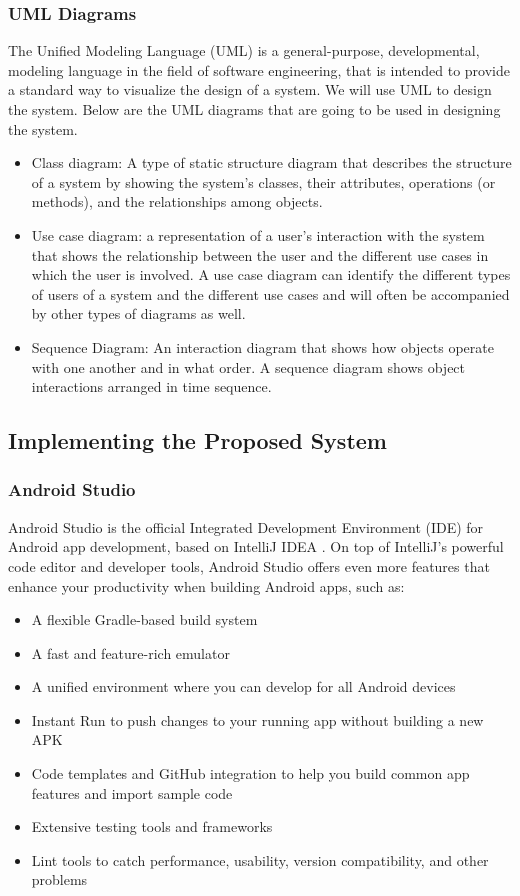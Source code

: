 \documentclass[12pt]{article}
\begin{document}
		\subsubsection{UML Diagrams}
		The Unified Modeling Language (UML) is a general-purpose, developmental, modeling language in the field of software engineering, that is intended to provide a standard way to visualize the design of a system. We will use UML to design the system. Below are the UML diagrams that are going to be used in designing the system.
			\begin{itemize}
				\item Class diagram: A type of static structure diagram that describes the structure of a system by showing the system's classes, their attributes, operations (or methods), and the relationships among objects.
				\item Use case diagram: a representation of a user's interaction with the system that shows the relationship between the user and the different use cases in which the user is involved. A use case diagram can identify the different types of users of a system and the different use cases and will often be accompanied by other types of diagrams as well.
				\item Sequence Diagram: An interaction diagram that shows how objects operate with one another and in what order. A sequence diagram shows object interactions arranged in time sequence.
			\end{itemize}
	
	
	\subsection{Implementing the Proposed System}
		\subsubsection{Android Studio}
		Android Studio is the official Integrated Development Environment (IDE) for Android app development, based on IntelliJ IDEA . On top of IntelliJ's powerful code editor and developer tools, Android Studio offers even more features that enhance your productivity when building Android apps, such as\cite{astudio}:
		\begin{itemize}
			\item A flexible Gradle-based build system
			\item A fast and feature-rich emulator
			\item A unified environment where you can develop for all Android devices
			\item Instant Run to push changes to your running app without building a new APK
			\item Code templates and GitHub integration to help you build common app features and import sample code
			\item Extensive testing tools and frameworks
			\item Lint tools to catch performance, usability, version compatibility, and other problems
		\end{itemize}
\end{document}
